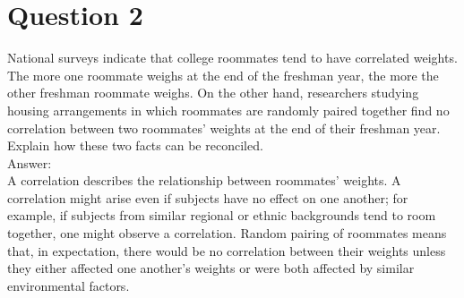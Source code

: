 \documentclass[11pt,notitlepage]{article}\usepackage[]{graphicx}\usepackage[]{color}
\begin{document}
\section*{Question 2}
National surveys indicate that college roommates tend to have correlated weights. The more one roommate weighs at the end of the freshman year, the more the other freshman roommate weighs. On the other hand, researchers studying housing arrangements in which roommates are randomly paired together find no correlation between two roommates' weights at the end of their freshman year. Explain how these two facts can be reconciled.\\
Answer:\\
A correlation describes the relationship between roommates' weights. A correlation might arise even if subjects have no effect on one another; for example, if subjects from similar regional or ethnic backgrounds tend to room together, one might observe a correlation. Random pairing of roommates means that, in expectation, there would be no correlation between their weights unless they either affected one another's weights or were both affected by similar environmental factors.
\end{document}
